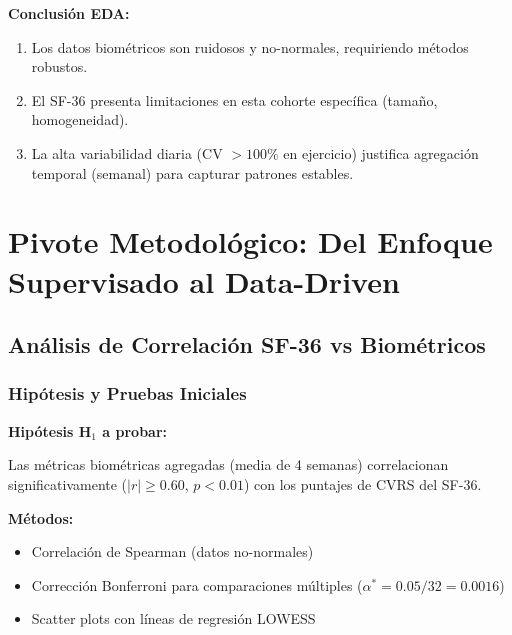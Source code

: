 \documentclass[12pt,letterpaper,twoside]{report}
\begin{document}
\begin{conclusionbox}
\textbf{Conclusión EDA:}

\begin{enumerate}[noitemsep]
    \item Los datos biométricos son ruidosos y no-normales, requiriendo métodos robustos.
    \item El SF-36 presenta limitaciones en esta cohorte específica (tamaño, homogeneidad).
    \item La alta variabilidad diaria (CV $> 100\%$ en ejercicio) justifica agregación temporal (semanal) para capturar patrones estables.
\end{enumerate}
\end{conclusionbox}

\chapter{Pivote Metodológico: Del Enfoque Supervisado al Data-Driven}

\section{Análisis de Correlación SF-36 vs Biométricos}

\subsection{Hipótesis y Pruebas Iniciales}

\begin{hipotesisbox}
\textbf{Hipótesis H$_1$ a probar:}

Las métricas biométricas agregadas (media de 4 semanas) correlacionan significativamente ($|r| \geq 0.60$, $p<0.01$) con los puntajes de CVRS del SF-36.
\end{hipotesisbox}

\begin{estadisticobox}
\textbf{Métodos:}

\begin{itemize}[noitemsep]
    \item Correlación de Spearman (datos no-normales)
    \item Corrección Bonferroni para comparaciones múltiples ($\alpha^* = 0.05 / 32 = 0.0016$)
    \item Scatter plots con líneas de regresión LOWESS
\end{itemize}
\end{estadisticobox}
\end{document}

